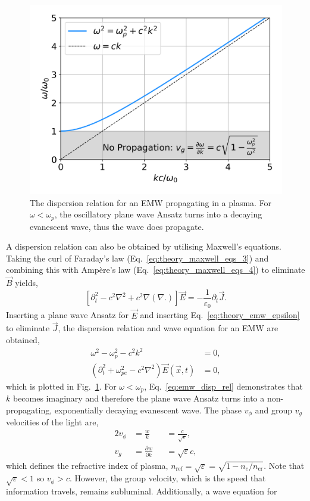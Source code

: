 \begin{figure}[t!]
    \includegraphics[width=0.6\linewidth]{Theory/Images/EMW_disp_rel.png}
    \centering
    \caption{The dispersion relation for an \ac{EMW} propagating in a plasma.
    For $\omega<\omega_p$, the oscillatory plane wave Ansatz turns into a decaying evanescent wave, thus the wave does propagate.}%
    \label{fig:EMW_disp_rel}
\end{figure}

A dispersion relation can also be obtained by utilising Maxwell's equations.
Taking the curl of Faraday's law (Eq.~\ref{eq:theory_maxwell_eqs_3}) and combining this with Amp\`ere's law (Eq.~\ref{eq:theory_maxwell_eqs_4}) to eliminate $\vec{B}$ yields,
\begin{equation}
    \label{eq:theory_manipulatedmaxwell}
    \left[ \partial_t^2 - c^2\nabla^2 + c^2 \nabla(\nabla.) \right]\vec{E} = -\frac{1}{\varepsilon_0}\partial_t \vec{J}.
\end{equation}
Inserting a plane wave Ansatz for $\vec{E}$ and inserting Eq.~\ref{eq:theory_emw_epsilon} to eliminate $\vec{J}$, the dispersion relation and wave equation for an \ac{EMW} are obtained,
\begin{align}
    \label{eq:emw_disp_rel}
    \omega^2 - \omega_p^2 - c^2 k^2 &= 0,\\
    \label{eq:theory_emw_wave_eq}
    \left( \partial_t^2 + \omega_{pe}^2 - c^2\nabla^2 \right)\vec{E}(\vec{x},t) &= 0,
\end{align}
which is plotted in Fig.~\ref{fig:EMW_disp_rel}.
For $\omega<\omega_p$, Eq.~\ref{eq:emw_disp_rel} demonstrates that $k$ becomes imaginary and therefore the plane wave Ansatz turns into a non-propagating, exponentially decaying evanescent wave.
The phase $v_\phi$ and group $v_g$ velocities of the light are,
\begin{alignat}{2}
    v_\phi &= \frac{w}{k} &&= \frac{c}{\sqrt{\varepsilon}},\\
    v_g &= \frac{\partial w}{\partial k} &&= \sqrt{\varepsilon} c,
\end{alignat}
which defines the refractive index of plasma, $n_{\text{ref}}=\sqrt{\varepsilon} = \sqrt{1-n_e/n_{\text{cr}}}$.
Note that $\sqrt{\varepsilon}<1$ so $v_\phi>c$.
However, the group velocity, which is the speed that information travels, remains subluminal.
Additionally, a wave equation for 


